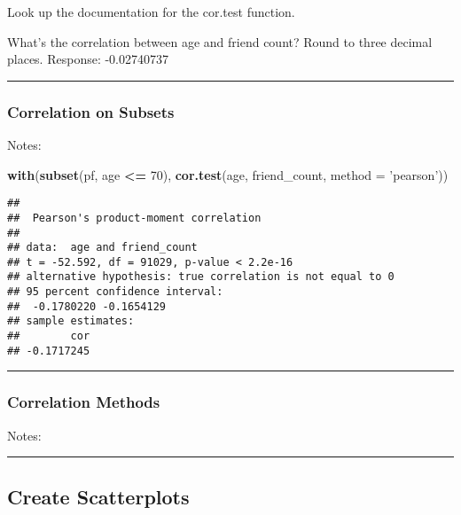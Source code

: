 \documentclass[]{article}
\newenvironment{Shaded}{\begin{snugshade}}{\end{snugshade}}
\newcommand{\KeywordTok}[1]{\textcolor[rgb]{0.13,0.29,0.53}{\textbf{#1}}}
\newcommand{\DataTypeTok}[1]{\textcolor[rgb]{0.13,0.29,0.53}{#1}}
\newcommand{\DecValTok}[1]{\textcolor[rgb]{0.00,0.00,0.81}{#1}}
\newcommand{\StringTok}[1]{\textcolor[rgb]{0.31,0.60,0.02}{#1}}
\newcommand{\OperatorTok}[1]{\textcolor[rgb]{0.81,0.36,0.00}{\textbf{#1}}}
\newcommand{\NormalTok}[1]{#1}
\begin{document}
Look up the documentation for the cor.test function.

What's the correlation between age and friend count? Round to three
decimal places. Response: -0.02740737

\begin{center}\rule{0.5\linewidth}{\linethickness}\end{center}

\subsubsection{Correlation on Subsets}\label{correlation-on-subsets}

Notes:

\begin{Shaded}
\begin{Highlighting}[]
\KeywordTok{with}\NormalTok{(}\KeywordTok{subset}\NormalTok{(pf, age }\OperatorTok{<=}\StringTok{ }\DecValTok{70}\NormalTok{), }\KeywordTok{cor.test}\NormalTok{(age, friend_count,}
                                     \DataTypeTok{method =} \StringTok{'pearson'}\NormalTok{))}
\end{Highlighting}
\end{Shaded}

\begin{verbatim}
## 
##  Pearson's product-moment correlation
## 
## data:  age and friend_count
## t = -52.592, df = 91029, p-value < 2.2e-16
## alternative hypothesis: true correlation is not equal to 0
## 95 percent confidence interval:
##  -0.1780220 -0.1654129
## sample estimates:
##        cor 
## -0.1717245
\end{verbatim}

\begin{center}\rule{0.5\linewidth}{\linethickness}\end{center}

\subsubsection{Correlation Methods}\label{correlation-methods}

Notes:

\begin{center}\rule{0.5\linewidth}{\linethickness}\end{center}

\subsection{Create Scatterplots}\label{create-scatterplots}
\end{document}
